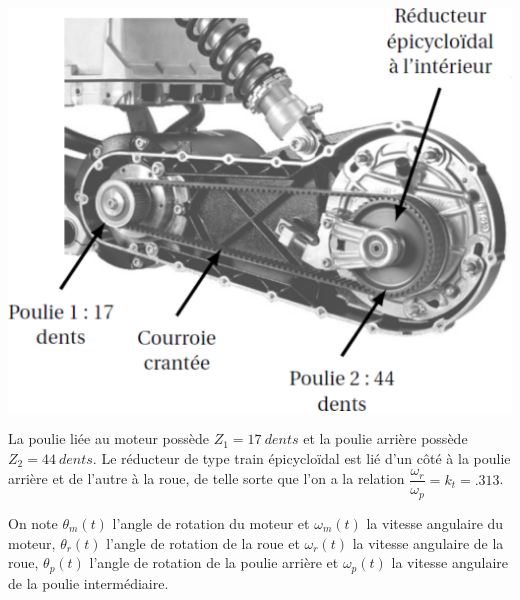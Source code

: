\documentclass[10pt,fleqn]{article} %
\begin{document}
\begin{multicols}{2}
\begin{center}
\includegraphics[width=.8\linewidth]{images/reducteur}
\end{center}

La poulie liée au moteur possède $Z_1=\SI{17}{dents}$ et la poulie arrière possède $Z_2=\SI{44}{dents}$. Le réducteur de type train épicycloïdal est lié d'un côté à la poulie arrière et de l'autre à la roue, de telle sorte que l'on a la relation $\dfrac{\omega_r}{\omega_p}=k_t=\num{.313}$.


On note $\theta_m(t)$ l'angle de rotation du moteur et $\omega_m(t)$ la vitesse angulaire du moteur, $\theta_r(t)$ l'angle de rotation de la roue et $\omega_r(t)$ la vitesse angulaire de la roue, $\theta_p(t)$ l'angle de rotation de la poulie arrière et $\omega_p(t)$ la vitesse angulaire de la poulie intermédiaire.


\end{multicols}
\end{document}
